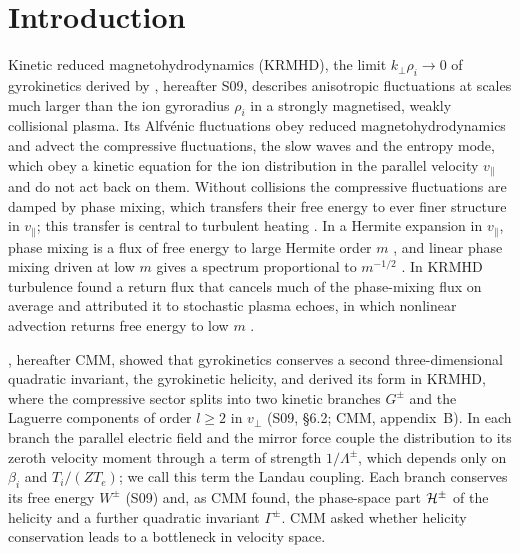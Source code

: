 \section{Introduction}\label{sec:intro}

Kinetic reduced magnetohydrodynamics (KRMHD), the limit $k_\perp\rho_i\to0$ of gyrokinetics derived by \citet{Schekochihin2009}, hereafter S09, describes anisotropic fluctuations at scales much larger than the ion gyroradius $\rho_i$ in a strongly magnetised, weakly collisional plasma. Its Alfv\'enic fluctuations obey reduced magnetohydrodynamics and advect the compressive fluctuations, the slow waves and the entropy mode, which obey a kinetic equation for the ion distribution in the parallel velocity $v_\parallel$ and do not act back on them. Without collisions the compressive fluctuations are damped \citetext{\citealp{Barnes1966}; S09} by phase mixing, which transfers their free energy to ever finer structure in $v_\parallel$; this transfer is central to turbulent heating \citep[S09;][]{Schekochihin2016,Meyrand2019,Zhou2023,Adkins2025}. In a Hermite expansion in $v_\parallel$, phase mixing is a flux of free energy to large Hermite order $m$ \citep{Kanekar2015,Schekochihin2016,AdkinsSchekochihin2018,Meyrand2019,Kawazura2020}, and linear phase mixing driven at low $m$ gives a spectrum proportional to $m^{-1/2}$ \citep{ZoccoSchekochihin2011,Kanekar2015}. In KRMHD turbulence \citet{Meyrand2019} found a return flux that cancels much of the phase-mixing flux on average and attributed it to stochastic plasma echoes, in which nonlinear advection returns free energy to low $m$ \citep{KanekarThesis2015,Schekochihin2016,Parker2016,AdkinsSchekochihin2018}.

\citet{Chandran2026}, hereafter CMM, showed that gyrokinetics conserves a second three-dimensional quadratic invariant, the gyrokinetic helicity, and derived its form in KRMHD, where the compressive sector splits into two kinetic branches $G^\pm$ and the Laguerre components of order $l\ge2$ in $v_\perp$ (S09, \S6.2; CMM, appendix~B). In each branch the parallel electric field and the mirror force couple the distribution to its zeroth velocity moment through a term of strength $1/\Lambda^\pm$, which depends only on $\beta_i$ and $T_i/(ZT_e)$; we call this term the Landau coupling. Each branch conserves its free energy $W^\pm$ (S09) and, as CMM found, the phase-space part $\mathcal H^\pm$ of the helicity and a further quadratic invariant $\Gamma^\pm$. CMM asked whether helicity conservation leads to a bottleneck in velocity space.


